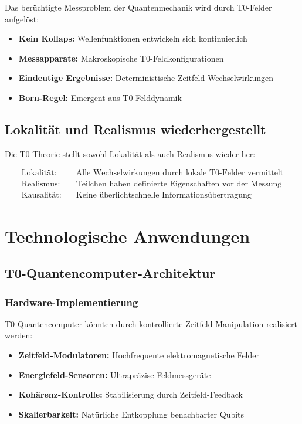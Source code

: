 	Das berüchtigte Messproblem der Quantenmechanik wird durch T0-Felder aufgelöst:
	
	\begin{itemize}
		\item \textbf{Kein Kollaps:} Wellenfunktionen entwickeln sich kontinuierlich
		\item \textbf{Messapparate:} Makroskopische T0-Feldkonfigurationen
		\item \textbf{Eindeutige Ergebnisse:} Deterministische Zeitfeld-Wechselwirkungen
		\item \textbf{Born-Regel:} Emergent aus T0-Felddynamik
	\end{itemize}
	
	\subsection{Lokalität und Realismus wiederhergestellt}
	
	Die T0-Theorie stellt sowohl Lokalität als auch Realismus wieder her:
	
	\begin{align}
		\text{Lokalität:} &\quad \text{Alle Wechselwirkungen durch lokale T0-Felder vermittelt} \\
		\text{Realismus:} &\quad \text{Teilchen haben definierte Eigenschaften vor der Messung} \\
		\text{Kausalität:} &\quad \text{Keine überlichtschnelle Informationsübertragung}
	\end{align}
	
	\section{Technologische Anwendungen}
	
	\subsection{T0-Quantencomputer-Architektur}
	
	\subsubsection{Hardware-Implementierung}
	
	T0-Quantencomputer könnten durch kontrollierte Zeitfeld-Manipulation realisiert werden:
	
	\begin{itemize}
		\item \textbf{Zeitfeld-Modulatoren:} Hochfrequente elektromagnetische Felder
		\item \textbf{Energiefeld-Sensoren:} Ultrapräzise Feldmessgeräte
		\item \textbf{Kohärenz-Kontrolle:} Stabilisierung durch Zeitfeld-Feedback
		\item \textbf{Skalierbarkeit:} Natürliche Entkopplung benachbarter Qubits
	\end{itemize}
	
